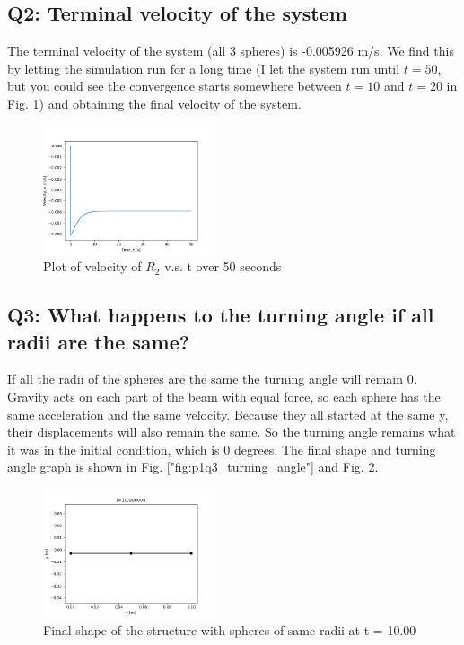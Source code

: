\documentclass[letterpaper, 10 pt, conference]{ieeeconf}  %
\begin{document}
\subsection*{ Q2: Terminal velocity of the system}

The terminal velocity of the system (all 3 spheres) is -0.005926 m/s. We find this by letting the simulation run for a long time (I let the system run until $t=50$, but you could see the convergence starts somewhere between $t=10$ and $t=20$ in Fig. \ref{"fig:p1q2_term_velocity"}) and obtaining the final velocity of the system.

\begin{figure}[!ht]
        \centering
        \includegraphics[width=0.45\textwidth,keepaspectratio]{p1q2_implicitfallingBeam_velocity.png}
        \caption{Plot of velocity of $R_2$ v.s. t over 50 seconds}
        \label{"fig:p1q2_term_velocity"}
\end{figure}

\subsection*{ Q3: What happens to the turning angle if all radii are the same? }

If all the radii of the spheres are the same the turning angle will remain 0. Gravity acts on each part of the beam with equal force, so each sphere has the same acceleration and the same velocity. Because they all started at the same y, their displacements will also remain the same. So the turning angle remains what it was in the initial condition, which is 0 degrees. The final shape and turning angle graph is shown in Fig. \ref{"fig:p1q3_turning_angle"} and Fig. \ref{"fig:p1q3_final_shape"}.

\begin{figure}[!ht]
        \centering
        \includegraphics[width=0.45\textwidth,keepaspectratio]{p1q3_implicit_10.00.png}
        \caption{Final shape of the structure with spheres of same radii at t = 10.00}
        \label{"fig:p1q3_final_shape"}
\end{figure}
\end{document}

